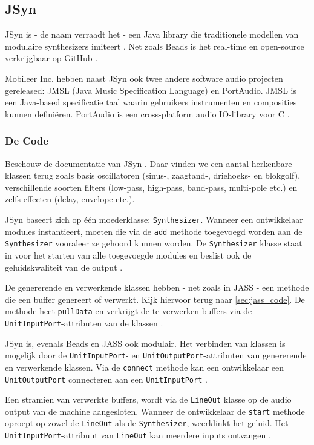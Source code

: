 \subsection{JSyn}

JSyn is - de naam verraadt het - een Java library die traditionele modellen van modulaire synthesizers imiteert \autocite{jsyn}. Net zoals Beads is het real-time en open-source verkrijgbaar op GitHub \autocite{jsyngit}.

Mobileer Inc. hebben naast JSyn ook twee andere software audio projecten gereleased: JMSL (Java Music Specification Language) en PortAudio. JMSL is een Java-based specificatie taal waarin gebruikers instrumenten en composities kunnen definiëren. PortAudio is een cross-platform audio IO-library voor C \autocite{jsyn}.

\subsubsection*{De Code}

Beschouw de documentatie van JSyn \autocite{jsyndocs}. Daar vinden we een aantal herkenbare klassen terug zoals basis oscillatoren (sinus-, zaagtand-, driehoeks- en blokgolf), verschillende soorten filters (low-pass, high-pass, band-pass, multi-pole etc.) en zelfs effecten (delay, envelope etc.).

JSyn baseert zich op één moederklasse: \verb+Synthesizer+. Wanneer een ontwikkelaar modules instantieert, moeten die via de \verb+add+ methode toegevoegd worden aan de \verb+Synthesizer+ vooraleer ze gehoord kunnen worden. De \verb+Synthesizer+ klasse staat in voor het starten van alle toegevoegde modules en beslist ook de geluidskwaliteit van de output \autocite{jsyndocs}.

De genererende en verwerkende klassen hebben - net zoals in JASS - een methode die een buffer genereert of verwerkt. Kijk hiervoor terug naar \ref{sec:jass_code}. De methode heet \verb+pullData+ en verkrijgt de te verwerken buffers via de \verb+UnitInputPort+-attributen van de klassen \autocite{jsyndocs}.

JSyn is, evenals Beads en JASS ook modulair. Het verbinden van klassen is mogelijk door de \verb+UnitInputPort+- en \verb+UnitOutputPort+-attributen van genererende en verwerkende klassen. Via de \verb+connect+ methode kan een ontwikkelaar een \verb+UnitOutputPort+ connecteren aan een \verb+UnitInputPort+ \autocite{jsyndocs}.

Een stramien van verwerkte buffers, wordt via de \verb+LineOut+ klasse op de audio output van de machine aangesloten. Wanneer de ontwikkelaar de \verb+start+ methode oproept op zowel de \verb+LineOut+ als de \verb+Synthesizer+, weerklinkt het geluid. Het \verb+UnitInputPort+-attribuut van \verb+LineOut+ kan meerdere inputs ontvangen \autocite{jsyndocs}.

